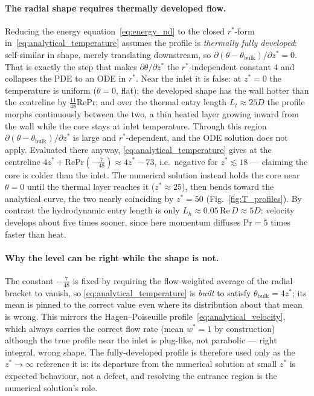 \documentclass[12pt,a4paper]{article}
\newcommand{\Rey}{\text{Re}}
\newcommand{\Pran}{\text{Pr}}
\begin{document}
\paragraph{The radial shape requires thermally developed flow.}
Reducing the energy equation~\eqref{eq:energy_nd} to the closed $r^*$-form
in~\eqref{eq:analytical_temperature} assumes the profile is \emph{thermally fully developed}:
self-similar in shape, merely translating downstream, so
$\partial(\theta-\theta_{\text{bulk}})/\partial z^* = 0$. That is exactly the step that makes
$\partial\theta/\partial z^*$ the $r^*$-independent constant $4$ and collapses the PDE to an ODE
in $r^*$. Near the inlet it is false: at $z^*=0$ the temperature is uniform ($\theta=0$, flat);
the developed shape has the wall hotter than the centreline by $\tfrac{11}{48}\Rey\Pran$; and
over the thermal entry length $L_t\approx 25D$ the profile morphs continuously between the two,
a thin heated layer growing inward from the wall while the core stays at inlet temperature.
Through this region $\partial(\theta-\theta_{\text{bulk}})/\partial z^*$ is large and
$r^*$-dependent, and the ODE solution does not apply. Evaluated there anyway,
\eqref{eq:analytical_temperature} gives at the centreline
$4z^* + \Rey\Pran(-\tfrac{7}{48}) \approx 4z^* - 73$, i.e.\ negative for $z^*\lesssim 18$ ---
claiming the core is colder than the inlet. The numerical solution instead holds the core near
$\theta=0$ until the thermal layer reaches it ($z^*\approx 25$), then bends toward the analytical
curve, the two nearly coinciding by $z^*=50$ (Fig.~\ref{fig:T_profiles}). By contrast the
hydrodynamic entry length is only $L_h\approx 0.05\,\Rey\,D \approx 5D$: velocity develops about
five times sooner, since here momentum diffuses $\Pran=5$ times faster than heat.

\paragraph{Why the level can be right while the shape is not.}
The constant $-\tfrac{7}{48}$ is fixed by requiring the flow-weighted average of the radial
bracket to vanish, so \eqref{eq:analytical_temperature} is \emph{built} to satisfy
$\theta_{\text{bulk}}=4z^*$; its mean is pinned to the correct value even where its distribution
about that mean is wrong. This mirrors the Hagen--Poiseuille
profile~\eqref{eq:analytical_velocity}, which always carries the correct flow rate (mean
$w^*=1$ by construction) although the true profile near the inlet is plug-like, not parabolic
--- right integral, wrong shape. The fully-developed profile is therefore used only as the
$z^*\!\to\!\infty$ reference it is: its departure from the numerical solution at small $z^*$ is
expected behaviour, not a defect, and resolving the entrance region is the numerical solution's
role.
\end{document}
